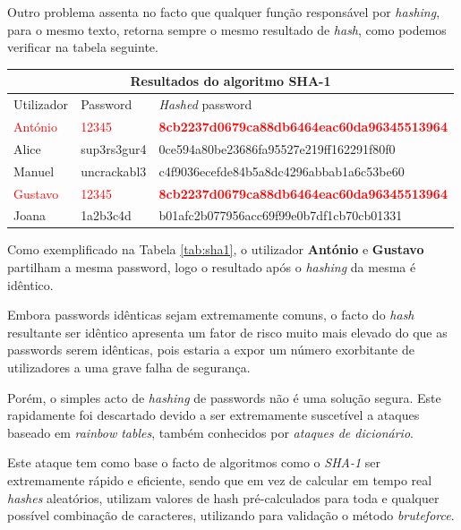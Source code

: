 Outro problema assenta no facto que qualquer função responsável por \emph{hashing}, para o mesmo texto, retorna sempre o mesmo resultado de \emph{hash}, como podemos verificar na tabela seguinte.

\begin{center}
    \begin{tabular}{ |p{2cm}|p{2cm}|p{8cm}|  }
        \hline
        \multicolumn{3}{|c|}{Resultados do algoritmo SHA-1} \\
        \hline
        Utilizador & Password & \emph{Hashed} password\\
        \hline
        \textcolor{red}{António} & \textcolor{red}{12345} & \textcolor{red}{\textbf{8cb2237d0679ca88db6464eac60da96345513964}}\\
        Alice & sup3rs3gur4 & 0ce594a80be23686fa95527e219ff162291f80f0\\
        Manuel & uncrackabl3 & c4f9036ecefde84b5a8dc4296abbab1a6c53be60\\
        \textcolor{red}{Gustavo} & \textcolor{red}{12345} & \textcolor{red}{\textbf{8cb2237d0679ca88db6464eac60da96345513964}}\\
        Joana & 1a2b3c4d & b01afc2b077956acc69f99e0b7df1cb70cb01331\\
        \hline
    \end{tabular}
\label{tab:sha1} 
\end{center}

Como exemplificado na Tabela \ref{tab:sha1}, o utilizador \textbf{António} e \textbf{Gustavo} partilham a mesma password, logo o resultado após o \emph{hashing} da mesma é idêntico. 

Embora passwords idênticas sejam extremamente comuns, o facto do \emph{hash} resultante ser idêntico apresenta um fator de risco muito mais elevado do que as passwords serem idênticas, pois estaria a expor um número exorbitante de utilizadores a uma grave falha de segurança.

Porém, o simples acto de \emph{hashing} de passwords não é uma solução segura. Este rapidamente foi descartado devido a ser extremamente suscetível a ataques baseado em \emph{rainbow tables}, também conhecidos por \emph{ataques de dicionário}.

Este ataque tem como base o facto de algoritmos como o \emph{SHA-1} ser extremamente rápido e eficiente, sendo que em vez de calcular em tempo real \emph{hashes} aleatórios, utilizam valores de hash pré-calculados para toda e qualquer possível combinação de caracteres, utilizando para validação o método \emph{bruteforce}.


